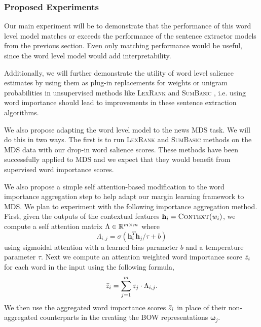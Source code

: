 \subsubsection{Proposed Experiments}

  Our main experiment will be to demonstrate that 
the performance of this word level model matches or exceeds the performance
of the sentence extractor models from the previous section. Even only matching 
performance would be useful, since the word level model would add
interpretability. 

Additionally, we will further demonstrate the utility of  word level salience
estimates 
by using them as plug-in replacements for \tfidf{} weights or unigram 
probabilities in unsupervised methods like  
\textsc{LexRank} \citep{erkan2004lexrank} and \textsc{SumBasic} 
\citep{nenkova2005impact}, i.e. using word importance should lead to 
improvements in these  sentence extraction algorithms.

We also propose adapting the word level model to the news MDS task. 
We will do this in two ways. The first is to run \textsc{LexRank} and 
\textsc{SumBasic} methods on the MDS data with our drop-in word salience
scores. These methods have been successfully applied to MDS and we expect that
they would benefit from supervised word importance scores.

We also propose a simple 
        self attention-based modification to
        the word importance aggregation step to help adapt our margin
learning framework to MDS. 
        We plan to experiment with the following importance 
        aggregation method. First, given the outputs of the contextual features
        $\mathbf{h}_i = \textsc{Context}(w_i)$, 
        we compute a self attention matrix $\Lambda \in \mathbb{R}^{m\times m}$
        where \[\Lambda_{i,j} = \sigma(\mathbf{h}_i^T \mathbf{h}_j / \tau + b)  \]
        using sigmoidal attention \citep{kim2017structured} with a learned bias 
        parameter $b$ and a temperature parameter $\tau$.
        Next we compute an attention weighted word importance score $\bar{z}_i$ for each word in the input using the following formula,
        \[ \bar{z}_i = \sum_{j=1}^m z_j \cdot \Lambda_{i,j}.\]
        We then use the aggregated word importance scores 
    $\bar{z}_i$ in place of their non-aggregated counterparts
    in the creating the BOW representations $\boldsymbol{\omega}_j$.

